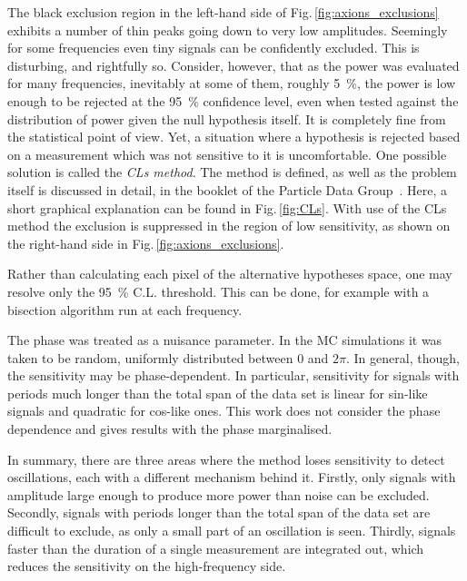 The black exclusion region in the left-hand side of Fig.\,\ref{fig:axions_exclusions} exhibits a number of thin peaks going down to very low amplitudes.
Seemingly for some frequencies even tiny signals can be confidently excluded.
This is disturbing, and rightfully so.
Consider, however, that as the power was evaluated for many frequencies, inevitably at some of them, roughly \SI{5}{\percent}, the power is low enough to be rejected at the \SI{95}{\percent} confidence level, even when tested against the distribution of power given the null hypothesis itself.
It is completely fine from the statistical point of view.
Yet, a situation where a hypothesis is rejected based on a measurement which was not sensitive to it is uncomfortable.
One possible solution is called the \emph{CLs method}.
The method is defined, as well as the problem itself is discussed in detail, in the booklet of the Particle Data Group~\cite{PDG2016}.
Here, a short graphical explanation can be found in Fig.\,\ref{fig:CLs}.
With use of the CLs method the exclusion is suppressed in the region of low sensitivity, as shown on the right-hand side in Fig.\,\ref{fig:axions_exclusions}.

Rather than calculating each pixel of the alternative hypotheses space, one may resolve only the \SI{95}{\percent} C.L.
threshold.
This can be done, for example with a bisection algorithm run at each frequency.

The phase was treated as a nuisance parameter.
In the MC simulations it was taken to be random, uniformly distributed between $0$ and $2\pi$.
In general, though, the sensitivity may be phase-dependent.
In particular, sensitivity for signals with periods much longer than the total span of the data set is linear for sin-like signals and quadratic for cos-like ones.
This work does not consider the phase dependence and gives results with the phase marginalised.

In summary, there are three areas where the method loses sensitivity to detect oscillations, each with a different mechanism behind it.
Firstly, only signals with amplitude large enough to produce more power than noise can be excluded.
Secondly, signals with periods longer than the total span of the data set are difficult to exclude, as only a small part of an oscillation is seen.
Thirdly, signals faster than the duration of a single measurement are integrated out, which reduces the sensitivity on the high-frequency side.




